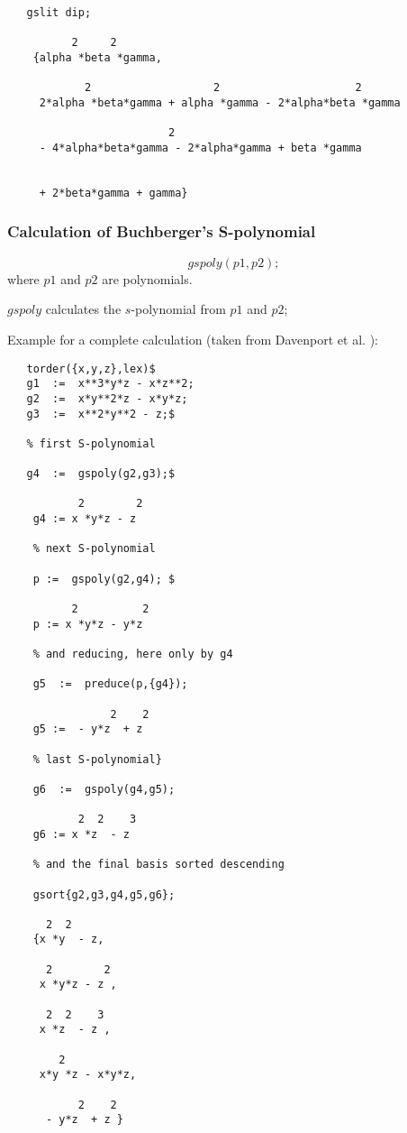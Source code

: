 \begin{verbatim}
   gslit dip;

          2     2
    {alpha *beta *gamma,

            2                   2                     2
     2*alpha *beta*gamma + alpha *gamma - 2*alpha*beta *gamma

                         2
     - 4*alpha*beta*gamma - 2*alpha*gamma + beta *gamma


     + 2*beta*gamma + gamma}

 \end{verbatim}

\subsubsection{Calculation of Buchberger's S-polynomial}
\[ gspoly (p1,p2); \]
where $p1$  and $p2$ are polynomials.

$gspoly$ calculates the $s$-polynomial from $p1$  and $p2$;

Example for a complete calculation (taken from {\sc Davenport et al.}
 \cite{Davenport:88a}):
\begin{verbatim}
   torder({x,y,z},lex)$
   g1  :=  x**3*y*z - x*z**2;
   g2  :=  x*y**2*z - x*y*z;
   g3  :=  x**2*y**2 - z;$

   % first S-polynomial

   g4  :=  gspoly(g2,g3);$

           2        2
    g4 := x *y*z - z

    % next S-polynomial

    p :=  gspoly(g2,g4); $

          2          2
    p := x *y*z - y*z

    % and reducing, here only by g4

    g5  :=  preduce(p,{g4});

                2    2
    g5 :=  - y*z  + z

    % last S-polynomial}

    g6  :=  gspoly(g4,g5);

           2  2    3
    g6 := x *z  - z

    % and the final basis sorted descending

    gsort{g2,g3,g4,g5,g6};

      2  2
    {x *y  - z,

      2        2
     x *y*z - z ,

      2  2    3
     x *z  - z ,

        2
     x*y *z - x*y*z,

           2    2
      - y*z  + z }
 \end{verbatim}




